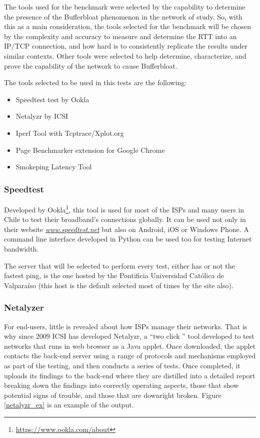The tools used for the benchmark were selected by the capability to
determine  the presence of the Bufferbloat phenomenon in the network of
study. So, with this as a main consideration, the
tools selected for  the benchmark will be chosen by the complexity and
accuracy to measure and  determine the RTT into an IP/TCP connection, and how
hard is to consistently  replicate the results under similar contexts. Other
tools were selected to help  determine, characterize, and prove the capability
of the network to cause  Bufferbloat.

\newpage 

The tools selected to be used in this tests are the following:

\begin{itemize}
    \item Speedtest test by Ookla
    \item Netalyzr by ICSI
    \item Iperf Tool with Tcptrace/Xplot.org
    \item Page Benchmarker extension for Google Chrome
    \item Smokeping Latency Tool
\end{itemize}

\subsubsection{Speedtest}

Developed by Ookla\footnote{\url{https://www.ookla.com/about}}, this tool is used
for most of the ISPs and many users in Chile to test their broadband's
connections globally. It can be used not only in their website 
\href{http://www.speedtest.net}{\emph{www.speedtest.net}} but also on Android,
iOS or Windows Phone. A command line interface developed in Python can be used 
too for testing Internet bandwidth.

The server that will be selected to perform every test, either has or not the
fastest ping, is the one hosted by the Pontificia Universidad Cat\'olica de
Valpara\'iso (this host is the default selected most of times by the site also).  

\subsubsection{Netalyzer}

For end-users, little is revealed about how ISPs manage their networks. That is
why since 2009 ICSI has developed Netalyzr, a ``two click '' tool developed to
test networks that runs in web browser as a Java applet. Once downloaded, the
applet contacts the back-end server using a range of protocols and mechanisms
employed as part of the testing, and then conducts a series of tests. Once
completed, it uploads its findings to the back-end where they are distilled
into a detailed report breaking down the findings into correctly operating
aspects, those that show potential signs of trouble, and those that are
downright broken. Figure \ref{netalyzr_ex} is an example of the output.

